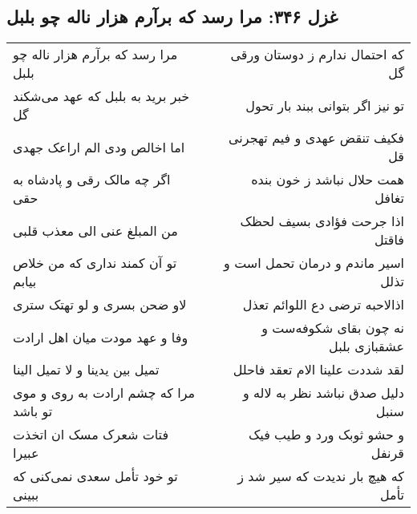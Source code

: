 \begin{center}
\section*{غزل ۳۴۶: مرا رسد که برآرم هزار ناله چو بلبل}
\label{sec:346}
\begin{longtable}{l p{0.5cm} r}
مرا رسد که برآرم هزار ناله چو بلبل
&&
که احتمال ندارم ز دوستان ورقی گل
\\
خبر برید به بلبل که عهد می‌شکند گل
&&
تو نیز اگر بتوانی ببند بار تحول
\\
اما اخالص ودی الم اراعک جهدی
&&
فکیف تنقض عهدی و فیم تهجرنی قل
\\
اگر چه مالک رقی و پادشاه به حقی
&&
همت حلال نباشد ز خون بنده تغافل
\\
من المبلغ عنی الی معذب قلبی
&&
اذا جرحت فؤادی بسیف لحظک فاقتل
\\
تو آن کمند نداری که من خلاص بیابم
&&
اسیر ماندم و درمان تحمل است و تذلل
\\
لاو ضحن بسری و لو تهتک ستری
&&
اذالاحبه ترضی دع اللوائم تعذل
\\
وفا و عهد مودت میان اهل ارادت
&&
نه چون بقای شکوفه‌ست و عشقبازی بلبل
\\
تمیل بین یدینا و لا تمیل الینا
&&
لقد شددت علینا الام تعقد فاحلل
\\
مرا که چشم ارادت به روی و موی تو باشد
&&
دلیل صدق نباشد نظر به لاله و سنبل
\\
فتات شعرک مسک ان اتخذت عبیرا
&&
و حشو ثوبک ورد و طیب فیک قرنفل
\\
تو خود تأمل سعدی نمی‌کنی که ببینی
&&
که هیچ بار ندیدت که سیر شد ز تأمل
\\
\end{longtable}
\end{center}
